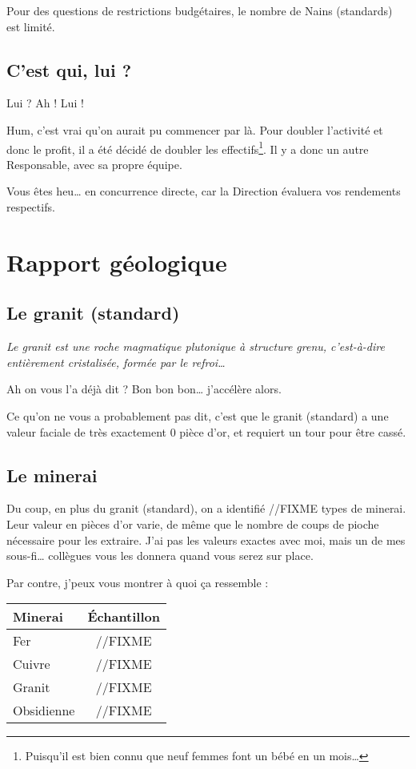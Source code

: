 Pour des questions de restrictions budgétaires, le nombre de Nains (standards) est limité.

\subsection{C'est qui, lui ?}
Lui ? Ah ! Lui !

Hum, c'est vrai qu'on aurait pu commencer par là. Pour doubler l'activité et donc le profit, il a été décidé de doubler les effectifs\footnote{Puisqu'il est bien connu que neuf femmes font un bébé en un mois\ldots{}}. Il y a donc un autre Responsable, avec sa propre équipe.

Vous êtes heu\ldots{} en concurrence directe, car la Direction évaluera vos rendements respectifs.

\newpage
\section{Rapport géologique}
\subsection{Le granit (standard)}
\textit{Le granit est une roche magmatique plutonique à structure grenu, c'est-à-dire entièrement cristalisée, formée par le refroi\ldots{}}

Ah on vous l'a déjà dit ? Bon bon bon\ldots{} j'accélère alors.

Ce qu'on ne vous a probablement pas dit, c'est que le granit (standard) a une valeur faciale de très exactement 0 pièce d'or, et requiert un tour pour être cassé.


\subsection{Le minerai}
Du coup, en plus du granit (standard), on a identifié //FIXME types de minerai. 
Leur valeur en pièces d'or varie, de même que le nombre de coups de pioche nécessaire pour les extraire.
J'ai pas les valeurs exactes avec moi, mais un de mes sous-fi\ldots{} collègues vous les donnera quand vous serez sur place.

Par contre, j'peux vous montrer à quoi ça ressemble :
\begin{center}
        \begin{tabular}{|l|c|}
                \hline
                Minerai & Échantillon \\
                \hline
                Fer & //FIXME \\
                Cuivre & //FIXME \\
                \hline
                Granit & //FIXME \\
                Obsidienne & //FIXME\\
                \hline
        \end{tabular}
\end{center}

